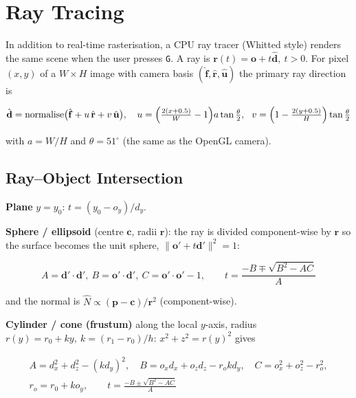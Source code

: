 \documentclass[12pt,a4paper]{report}
\begin{document}
\section{Ray Tracing}

In addition to real-time rasterisation, a CPU ray tracer (Whitted style) renders the same scene when the user presses \texttt{G}. A ray is $\mathbf{r}(t)=\mathbf{o}+t\hat{\mathbf{d}},\ t>0$. For pixel $(x,y)$ of a $W\times H$ image with camera basis $(\hat{\mathbf{f}},\hat{\mathbf{r}},\hat{\mathbf{u}})$ the primary ray direction is

\begin{equation}
\hat{\mathbf{d}}=\text{normalise}\bigl(\hat{\mathbf{f}}+u\,\hat{\mathbf{r}}+v\,\hat{\mathbf{u}}\bigr),\quad u=\Bigl(\tfrac{2(x+0.5)}{W}-1\Bigr)a\tan\tfrac{\theta}{2},\ \ v=\Bigl(1-\tfrac{2(y+0.5)}{H}\Bigr)\tan\tfrac{\theta}{2}
\label{eq:primary}
\end{equation}

with $a=W/H$ and $\theta=51^\circ$ (the same as the OpenGL camera).

\subsection{Ray--Object Intersection}

\textbf{Plane} $y=y_0$: $t=(y_0-o_y)/d_y$.

\textbf{Sphere / ellipsoid} (centre $\mathbf{c}$, radii $\mathbf{r}$): the ray is divided component-wise by $\mathbf{r}$ so the surface becomes the unit sphere, $\lVert\mathbf{o}'+t\mathbf{d}'\rVert^2=1$:

\begin{equation}
A=\mathbf{d}'\!\cdot\!\mathbf{d}',\ B=\mathbf{o}'\!\cdot\!\mathbf{d}',\ C=\mathbf{o}'\!\cdot\!\mathbf{o}'-1,\qquad t=\frac{-B\mp\sqrt{B^2-AC}}{A}
\label{eq:sphere}
\end{equation}

and the normal is $\hat{N}\propto(\mathbf{p}-\mathbf{c})/\mathbf{r}^2$ (component-wise).

\textbf{Cylinder / cone (frustum)} along the local $y$-axis, radius $r(y)=r_0+ky,\ k=(r_1-r_0)/h$: $x^2+z^2=r(y)^2$ gives

\begin{equation}
\begin{gathered}
A=d_x^2+d_z^2-(kd_y)^2,\quad B=o_xd_x+o_zd_z-r_ok d_y,\quad C=o_x^2+o_z^2-r_o^2,\\
r_o=r_0+ko_y,\qquad t=\frac{-B\pm\sqrt{B^2-AC}}{A}
\end{gathered}
\label{eq:cone}
\end{equation}
\end{document}
